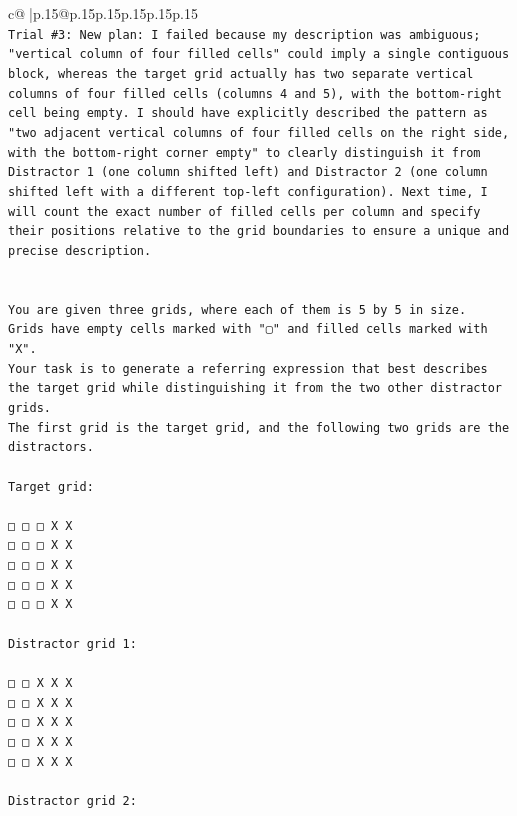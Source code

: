 \documentclass{article}
\begin{document}
{\begin{supertabular}{c@{$\;$}|p{.15\linewidth}@{}p{.15\linewidth}p{.15\linewidth}p{.15\linewidth}p{.15\linewidth}p{.15\linewidth}}
{{{\\ 
\texttt{Trial \#3: New plan: I failed because my description was ambiguous; "vertical column of four filled cells" could imply a single contiguous block, whereas the target grid actually has two separate vertical columns of four filled cells (columns 4 and 5), with the bottom{-}right cell being empty. I should have explicitly described the pattern as "two adjacent vertical columns of four filled cells on the right side, with the bottom{-}right corner empty" to clearly distinguish it from Distractor 1 (one column shifted left) and Distractor 2 (one column shifted left with a different top{-}left configuration). Next time, I will count the exact number of filled cells per column and specify their positions relative to the grid boundaries to ensure a unique and precise description.} \\
\\ 
\\ 
\texttt{You are given three grids, where each of them is 5 by 5 in size.} \\
\texttt{Grids have empty cells marked with "▢" and filled cells marked with "X".} \\
\texttt{Your task is to generate a referring expression that best describes the target grid while distinguishing it from the two other distractor grids.} \\
\texttt{The first grid is the target grid, and the following two grids are the distractors.} \\
\\ 
\texttt{Target grid:} \\
\\ 
\texttt{□ □ □ X X} \\
\texttt{□ □ □ X X} \\
\texttt{□ □ □ X X} \\
\texttt{□ □ □ X X} \\
\texttt{□ □ □ X X} \\
\\ 
\texttt{Distractor grid 1:} \\
\\ 
\texttt{□ □ X X X} \\
\texttt{□ □ X X X} \\
\texttt{□ □ X X X} \\
\texttt{□ □ X X X} \\
\texttt{□ □ X X X} \\
\\ 
\texttt{Distractor grid 2:} \\
\\ 
}}}
\end{supertabular}}
\end{document}
